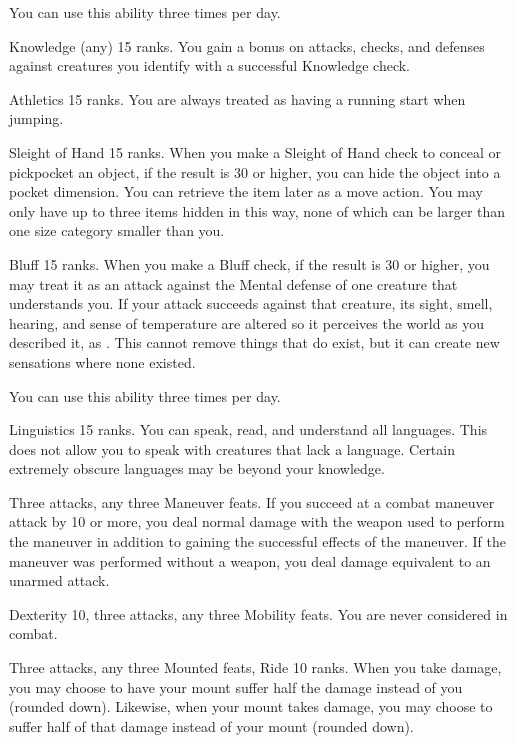You can use this ability three times per day.

\featpre Knowledge (any) 15 ranks.
\featben You gain a  bonus on attacks, checks, and defenses against creatures you identify with a successful Knowledge check.

\featpre Athletics 15 ranks.
\featben You are always treated as having a running start when jumping.

\featpre Sleight of Hand 15 ranks.
\featben When you make a Sleight of Hand check to conceal or pickpocket an object, if the result is 30 or higher, you can hide the object into a pocket dimension.
You can retrieve the item later as a move action.
You may only have up to three items hidden in this way, none of which can be larger than one size category smaller than you.

\featpre Bluff 15 ranks.
\featben When you make a Bluff check, if the result is 30 or higher, you may treat it as an attack against the Mental defense of one creature that understands you.
If your attack succeeds against that creature, its sight, smell, hearing, and sense of temperature are altered so it perceives the world as you described it, as .
This cannot remove things that do exist, but it can create new sensations where none existed.

You can use this ability three times per day.

\featpre Linguistics 15 ranks.
\featben You can speak, read, and understand all languages.
This does not allow you to speak with creatures that lack a language.
Certain extremely obscure languages may be beyond your knowledge.

\featpres Three attacks, any three Maneuver feats.
\featben If you succeed at a combat maneuver attack by 10 or more, you deal normal damage with the weapon used to perform the maneuver in addition to gaining the successful effects of the maneuver.
If the maneuver was performed without a weapon, you deal damage equivalent to an unarmed attack.

\featpres Dexterity 10, three attacks, any three Mobility feats.
\featben You are never considered \engaged in combat.

\featpres Three attacks, any three Mounted feats, Ride 10 ranks.
\featben When you take damage, you may choose to have your mount suffer half the damage instead of you (rounded down).
Likewise, when your mount takes damage, you may choose to suffer half of that damage instead of your mount (rounded down).


